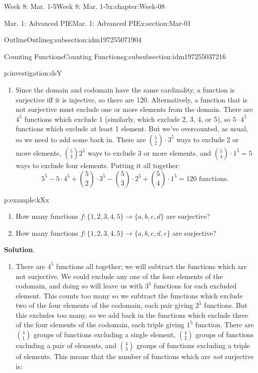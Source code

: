 \documentclass[oneside,10pt,]{book}
\newcommand{\blocktitlefont}{\relax}
\numberwithin{equation}{section}
\begin{document}
\begin{chapterptx}{Week 8: Mar. 1-5}{}{Week 8: Mar. 1-5}{}{}{x:chapter:Week-08}
\begin{sectionptx}{Mar. 1: Advanced PIE}{}{Mar. 1: Advanced PIE}{}{}{x:section:Mar-01}
\begin{subsectionptx}{Outline}{}{Outline}{}{}{g:subsection:idm197255071904}
\begin{subsubsectionptx}{Counting Functions}{}{Counting Functions}{}{}{g:subsubsection:idm197255037216}
\begin{investigation}{}{p:investigation:dsY}
\begin{enumerate}
\item{}Since the domain and codomain have the same cardinality, a function is surjective iff it is injective, so there are 120. Alternatively, a function that is not surjective must exclude one or more elements from the domain. There are \(4^5\) functions which exclude \(1\) (similarly, which exclude 2, 3, 4, or 5), so \(5\cdot 4^5\) functions which exclude at least 1 element. But we've overcounted, as usual, so we need to add some back in. There are \(\binom{5}{2}\cdot 3^5\) ways to exclude 2 or more elements, \(\binom{5}{3} 2^5\) ways to exclude 3 or more elements, and \(\binom{5}{4}\cdot 1^5 = 5\) ways to exclude four elements. Putting it all together:%
\begin{equation*}
5^5- 5\cdot 4^5 + \binom{5}{2}\cdot 3^5 - \binom{5}{3}\cdot 2^5 + \binom{5}{4}\cdot 1^5 = 120\text{ functions}.
\end{equation*}
%
\end{enumerate}
\end{investigation}%
\begin{example}{}{p:example:kXx}%
%
\begin{enumerate}
\item{}How many functions \(f: \{1,2,3,4,5\} \to \{a,b,c,d\}\) are surjective?%
\item{}How many functions \(f: \{1,2,3,4,5\} \to \{a,b,c,d,e\}\) are surjective?%
\end{enumerate}
%
\par\smallskip%
\noindent\textbf{\blocktitlefont Solution}.\hypertarget{p:solution:Lpu}{}\quad{}%
\begin{enumerate}
\item{}There are \(4^5\) functions all together; we will subtract the functions which are not surjective. We could exclude any one of the four elements of the codomain, and doing so will leave us with \(3^5\) functions for each excluded element. This counts too many so we subtract the functions which exclude two of the four elements of the codomain, each pair giving \(2^5\) functions. But this excludes too many, so we add back in the functions which exclude three of the four elements of the codomain, each triple giving \(1^5\) function. There are \({4 \choose 1}\) groups of functions excluding a single element, \({4 \choose 2}\) groups of functions excluding a pair of elements, and \({4 \choose 3}\) groups of functions excluding a triple of elements. This means that the number of functions which are \emph{not} surjective is:%
\begin{equation*}

\end{equation*}
\end{enumerate}
\end{example}
\end{subsubsectionptx}
\end{subsectionptx}
\end{sectionptx}
\end{chapterptx}
\end{document}

